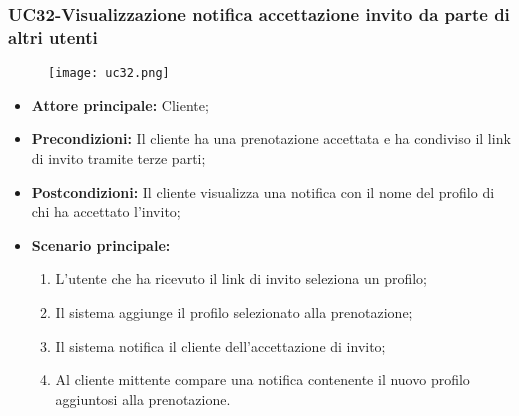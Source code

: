 \pagebreak
\subsubsection{UC32-Visualizzazione notifica accettazione invito da parte di altri utenti}
\begin{figure}[h] \texttt{[image: uc32.png]} \end{figure}
\begin{itemize}
\item \textbf{Attore principale:} Cliente;
\item \textbf{Precondizioni:} Il cliente ha una prenotazione accettata e ha condiviso il link di invito tramite terze parti;
\item \textbf{Postcondizioni:} Il cliente visualizza una notifica con il nome del profilo di chi ha accettato l'invito;
\item \textbf{Scenario principale:}
\begin{enumerate}
    \item L'utente che ha ricevuto il link di invito seleziona un profilo;
    \item Il sistema aggiunge il profilo selezionato alla prenotazione;
    \item Il sistema notifica il cliente dell'accettazione di invito;
    \item Al cliente mittente compare una notifica contenente il nuovo profilo aggiuntosi alla prenotazione.
\end{enumerate}
\end{itemize}
